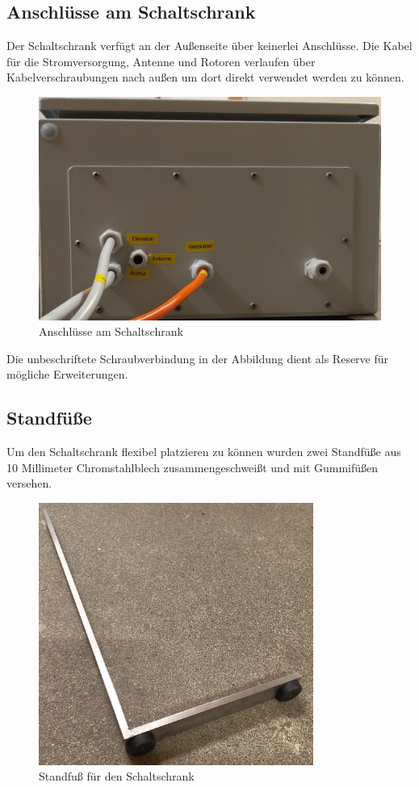 \subsection{Anschlüsse am Schaltschrank}
Der Schaltschrank verfügt an der Außenseite über keinerlei Anschlüsse. Die Kabel für die Stromversorgung, Antenne und Rotoren verlaufen über Kabelverschraubungen nach außen um dort direkt verwendet werden zu können. 

\begin{figure}[H]
	\centering
	\includegraphics[width=0.7\linewidth]{../ref/Schaltschrank_Anschluss.jpeg}
	\caption{Anschlüsse am Schaltschrank}
	\label{fig:schaltschrankanschluesse}
\end{figure}

Die unbeschriftete Schraubverbindung in der Abbildung dient als Reserve für mögliche Erweiterungen.

\subsection{Standfüße}
Um den Schaltschrank flexibel platzieren zu können wurden zwei Standfüße aus 10 Millimeter Chromstahlblech zusammengeschweißt und mit Gummifüßen versehen. 

\begin{figure}[H]
	\centering
	\includegraphics[width=9cm]{../ref/Schaltschrank_Fuss.jpeg}
	\caption{Standfuß für den Schaltschrank}
	\label{fig:schaltschrankfuss}
\end{figure}

